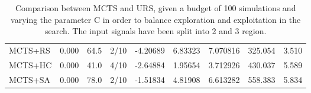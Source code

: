 \documentclass[11pt]{article}
\begin{document}
\begin{table}[ht]
\begin{tabular}{|l|l|c|c|c|c|c|c|c|}
MCTS+RS                                     & 0.000              &  64.5                   & 2/10                          & -4.20689  & 6.83323  & 7.070816 &  325.054 &  3.510    \\
MCTS+HC                                     & 0.000              &  41.0                   & 4/10                          & -2.64884  & 1.95654  & 3.712926 &  430.037 &  5.589    \\
MCTS+SA                                     & 0.000              &  78.0                   & 2/10                          & -1.51834  & 4.81908  & 6.613282 &  558.383 &  5.834    \\ \hline
\end{tabular}
\caption{Comparison between MCTS and URS, given a budget of 100 simulations and varying the parameter C in order to balance exploration and exploitation in the search. The input signals have been split into 2 and 3 region.}
\end{table}
\end{document}
